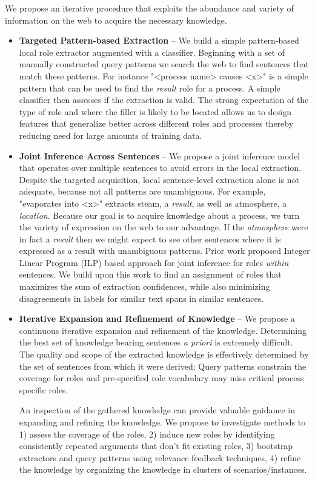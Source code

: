 We propose an iterative procedure that exploits the abundance and variety of information on the web to acquire the necessary knowledge.
\begin{itemize}
\item {\bf Targeted Pattern-based Extraction} --  We build a simple pattern-based local role extractor augmented with a classifier.
Beginning with a set of manually constructed query patterns we search the web to find sentences that match these patterns.
For instance "<process name> causes <x>" is a simple pattern that can be used to find the {\em result} role for a process. 
A simple classifier then assesses if the extraction is valid.
The strong expectation of the type of role and where the filler is likely to be located allows us to design features
that generalize better across different roles and processes thereby reducing need for large amounts of training data.

\item {\bf Joint Inference Across Sentences} --  We propose a joint inference model that operates over multiple sentences to avoid errors in the local extraction.
Despite the targeted acquisition, local sentence-level extraction alone is not adequate, because not all patterns are unambiguous. 
For example, "evaporates into <x>" extracts steam, a {\em result}, as well as atmosphere, a {\em location}. 
Because our goal is to acquire knowledge about a process, we turn the variety of expression on the web to our advantage. 
If the {\em atmosphere} were in fact a {\em result} then we might expect to see other sentences
where it is expressed as a result with unambiguous patterns.
Prior work proposed Integer Linear Program (ILP) based approach for joint inference for roles {\em within} sentences.
We build upon this work to find an assignment of roles that maximizes the sum of extraction confidences, 
while also minimizing disagreements in labels for similar text spans in similar sentences.

\item {\bf Iterative Expansion and Refinement of Knowledge} -- We propose a continuous iterative expansion and refinement of the knowledge.
Determining the best set of knowledge bearing sentences {\em a priori} is extremely difficult. 
The quality and scope of the extracted knowledge is effectively determined by the set of sentences from which it were derived:
Query patterns constrain the coverage for roles and pre-specified role vocabulary may miss critical process specific roles.

An inspection of the gathered knowledge can provide valuable guidance in expanding and refining the knowledge.
We propose to investigate methods to 1) assess the coverage of the roles, 2) induce new roles by identifying consistently repeated arguments that don't fit existing roles,  
3) bootstrap extractors and query patterns using relevance feedback techniques, 4) refine the knowledge by organizing the knowledge in clusters of scenarios/instances.

\end{itemize}

